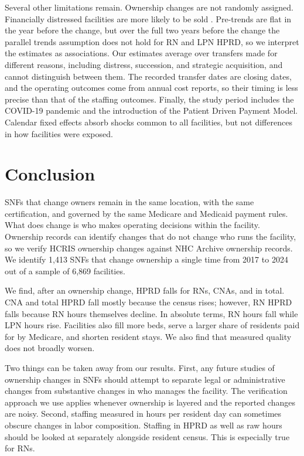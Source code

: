 \documentclass[12pt]{article}
\begin{document}
Several other limitations remain. Ownership changes are not randomly assigned. Financially distressed facilities are more likely to be sold \citep{bowblis_2011, lu_lu_2022}. Pre-trends are flat in the year before the change, but over the full two years before the change the parallel trends assumption does not hold for RN and LPN HPRD, so we interpret the estimates as associations. Our estimates average over transfers made for different reasons, including distress, succession, and strategic acquisition, and cannot distinguish between them. The recorded transfer dates are closing dates, and the operating outcomes come from annual cost reports, so their timing is less precise than that of the staffing outcomes. Finally, the study period includes the COVID-19 pandemic and the introduction of the Patient Driven Payment Model. Calendar fixed effects absorb shocks common to all facilities, but not differences in how facilities were exposed.

\section{Conclusion} \label{sec:conclusion}

SNFs that change owners remain in the same location, with the same certification, and governed by the same Medicare and Medicaid payment rules. What does change is who makes operating decisions within the facility. Ownership records can identify changes that do not change who runs the facility, so we verify HCRIS ownership changes against NHC Archive ownership records. We identify 1,413 SNFs that change ownership a single time from 2017 to 2024 out of a sample of 6,869 facilities.

We find, after an ownership change, HPRD falls for RNs, CNAs, and in total. CNA and total HPRD fall mostly because the census rises; however, RN HPRD falls because RN hours themselves decline. In absolute terms, RN hours fall while LPN hours rise. Facilities also fill more beds, serve a larger share of residents paid for by Medicare, and shorten resident stays. We also find that measured quality does not broadly worsen.

Two things can be taken away from our results. First, any future studies of ownership changes in SNFs should attempt to separate legal or administrative changes from substantive changes in who manages the facility. The verification approach we use applies whenever ownership is layered and the reported changes are noisy. Second, staffing measured in hours per resident day can sometimes obscure changes in labor composition. Staffing in HPRD as well as raw hours should be looked at separately alongside resident census. This is especially true for RNs.
\end{document}
